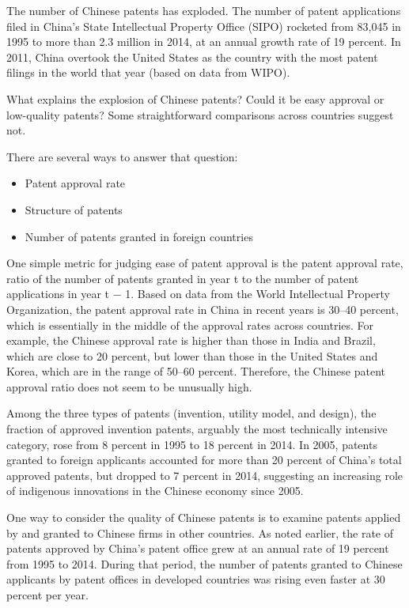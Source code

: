 \documentclass{article}
\begin{document}
    The number of Chinese patents has exploded. The number of patent applications filed in China’s State Intellectual Property Office (SIPO) rocketed from 83,045 in 1995 to more than 2.3 million in 2014, at an annual growth rate of 19 percent. In 2011, China overtook the United States as the country with the most patent filings in the world that year (based on data from WIPO).

    What explains the explosion of Chinese patents? Could it be easy approval or low-quality patents? Some straightforward comparisons across countries suggest not.

    There are several ways to answer that question:
    \begin{itemize}
        \item Patent approval rate
        \item Structure of patents
        \item Number of patents granted in foreign countries
    \end{itemize}
    
    One simple metric for judging ease of patent approval is the patent approval rate, ratio of the number of patents granted in year t to the number of patent applications in year t − 1. Based on data from the World Intellectual Property Organization, the patent approval rate in China in recent years is 30–40 percent, which is essentially in the middle of the approval rates across countries. For example, the Chinese approval rate is higher than those in India and Brazil, which are close to 20 percent, but lower than those in the United States and Korea, which are in the range of 50–60 percent. Therefore, the Chinese patent approval ratio does not seem to be unusually high.

    Among the three types of patents (invention, utility model, and design), the fraction of approved invention patents, arguably the most technically intensive category, rose from 8 percent in 1995 to 18 percent in 2014. In 2005, patents granted to foreign applicants accounted for more than 20 percent of China’s total approved patents, but dropped to 7 percent in 2014, suggesting an increasing role of indigenous innovations in the Chinese economy since 2005.

    One way to consider the quality of Chinese patents is to examine patents applied by and granted to Chinese firms in other countries. As noted earlier, the rate of patents approved by China’s patent office grew at an annual rate of 19 percent from 1995 to 2014. During that period, the number of patents granted to Chinese applicants by patent offices in developed countries was rising even faster at 30 percent per year.
\end{document}
